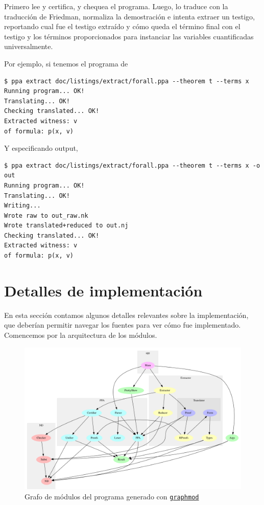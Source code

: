 Primero lee y certifica, y chequea el programa. Luego, lo traduce con la
traducción de Friedman, normaliza la demostración e intenta extraer un testigo,
reportando cual fue el testigo extraído y cómo queda el término final con el
testigo y los términos proporcionados para instanciar las variables
cuantificadas universalmente.

Por ejemplo, si tenemos el programa de 

\begin{verbatim}
$ ppa extract doc/listings/extract/forall.ppa --theorem t --terms x
Running program... OK!
Translating... OK!
Checking translated... OK!
Extracted witness: v
of formula: p(x, v)
\end{verbatim}

Y especificando output,

\begin{verbatim}
$ ppa extract doc/listings/extract/forall.ppa --theorem t --terms x -o out
Running program... OK!
Translating... OK!
Writing...
Wrote raw to out_raw.nk
Wrote translated+reduced to out.nj
Checking translated... OK!
Extracted witness: v
of formula: p(x, v) 
\end{verbatim}

\section{Detalles de implementación}

En esta sección contamos algunos detalles relevantes sobre la implementación,
que deberían permitir navegar los fuentes para ver cómo fue implementado.
Comencemos por la arquitectura de los módulos.

\begin{figure}[h]
    \centering
    \includegraphics[scale=0.38]{img/modules.png}
    \caption{Grafo de módulos del programa \ppaTool{} generado con \href{https://github.com/yav/graphmod}{\texttt{graphmod}}}
\end{figure}

